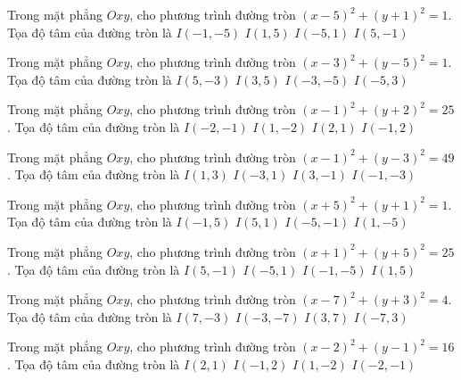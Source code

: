\begin{ex}
Trong mặt phẳng $Oxy$, cho phương trình đường tròn $(x -5)^2   + (y + 1)^2 = 1$. Tọa độ tâm của đường tròn là
\choice
{ $I(-1, -5)$ }
{ $I(1, 5)$ }
{ $I(-5, 1)$ }
{ \True $I(5, -1)$ }
\end{ex}

\begin{ex}
Trong mặt phẳng $Oxy$, cho phương trình đường tròn $(x -3)^2   + (y -5)^2 = 1$. Tọa độ tâm của đường tròn là
\choice
{ $I(5, -3)$ }
{ \True $I(3, 5)$ }
{ $I(-3, -5)$ }
{ $I(-5, 3)$ }
\end{ex}

\begin{ex}
Trong mặt phẳng $Oxy$, cho phương trình đường tròn $(x -1)^2   + (y + 2)^2 = 25$. Tọa độ tâm của đường tròn là
\choice
{ $I(-2, -1)$ }
{ \True $I(1, -2)$ }
{ $I(2, 1)$ }
{ $I(-1, 2)$ }
\end{ex}

\begin{ex}
Trong mặt phẳng $Oxy$, cho phương trình đường tròn $(x -1)^2   + (y -3)^2 = 49$. Tọa độ tâm của đường tròn là
\choice
{ \True $I(1, 3)$ }
{ $I(-3, 1)$ }
{ $I(3, -1)$ }
{ $I(-1, -3)$ }
\end{ex}

\begin{ex}
Trong mặt phẳng $Oxy$, cho phương trình đường tròn $(x + 5)^2  + (y + 1)^2 = 1$. Tọa độ tâm của đường tròn là
\choice
{ $I(-1, 5)$ }
{ $I(5, 1)$ }
{ \True $I(-5, -1)$ }
{ $I(1, -5)$ }
\end{ex}

\begin{ex}
Trong mặt phẳng $Oxy$, cho phương trình đường tròn $(x + 1)^2  + (y + 5)^2 = 25$. Tọa độ tâm của đường tròn là
\choice
{ $I(5, -1)$ }
{ $I(-5, 1)$ }
{ \True $I(-1, -5)$ }
{ $I(1, 5)$ }
\end{ex}

\begin{ex}
Trong mặt phẳng $Oxy$, cho phương trình đường tròn $(x -7)^2   + (y + 3)^2 = 4$. Tọa độ tâm của đường tròn là
\choice
{ \True $I(7, -3)$ }
{ $I(-3, -7)$ }
{ $I(3, 7)$ }
{ $I(-7, 3)$ }
\end{ex}

\begin{ex}
Trong mặt phẳng $Oxy$, cho phương trình đường tròn $(x -2)^2   + (y -1)^2 = 16$. Tọa độ tâm của đường tròn là
\choice
{ \True $I(2, 1)$ }
{ $I(-1, 2)$ }
{ $I(1, -2)$ }
{ $I(-2, -1)$ }
\end{ex}

